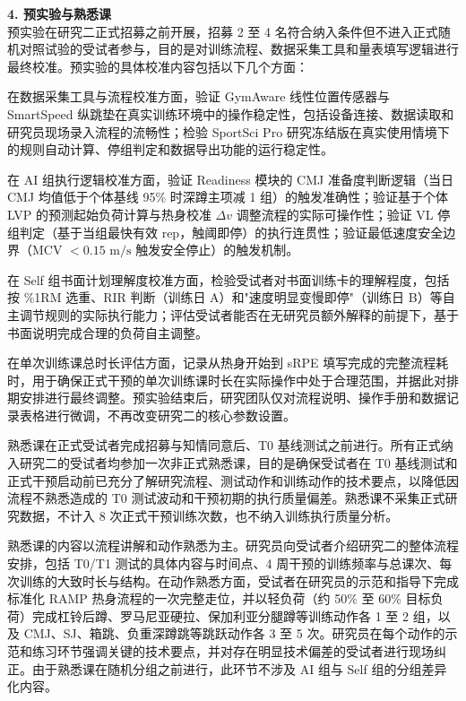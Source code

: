 \documentclass[UTF8,zihao=-4,twoside,openany]{ctexbook}
\begin{document}
\vspace{0.2cm}
\noindent \textbf{4. 预实验与熟悉课} \\
预实验在研究二正式招募之前开展，招募 2 至 4 名符合纳入条件但不进入正式随机对照试验的受试者参与，目的是对训练流程、数据采集工具和量表填写逻辑进行最终校准。预实验的具体校准内容包括以下几个方面：

在数据采集工具与流程校准方面，验证 GymAware 线性位置传感器与 SmartSpeed 纵跳垫在真实训练环境中的操作稳定性，包括设备连接、数据读取和研究员现场录入流程的流畅性；检验 SportSci Pro 研究冻结版在真实使用情境下的规则自动计算、停组判定和数据导出功能的运行稳定性。

在 AI 组执行逻辑校准方面，验证 Readiness 模块的 CMJ 准备度判断逻辑（当日 CMJ 均值低于个体基线 95\% 时深蹲主项减 1 组）的触发准确性；验证基于个体 LVP 的预测起始负荷计算与热身校准 $\Delta v$ 调整流程的实际可操作性；验证 VL 停组判定（基于当组最快有效 rep，触阈即停）的执行连贯性；验证最低速度安全边界（MCV $<0.15\text{ m/s}$ 触发安全停止）的触发机制。

在 Self 组书面计划理解度校准方面，检验受试者对书面训练卡的理解程度，包括按 \%1RM 选重、RIR 判断（训练日 A）和"速度明显变慢即停"（训练日 B）等自主调节规则的实际执行能力；评估受试者能否在无研究员额外解释的前提下，基于书面说明完成合理的负荷自主调整。

在单次训练课总时长评估方面，记录从热身开始到 sRPE 填写完成的完整流程耗时，用于确保正式干预的单次训练课时长在实际操作中处于合理范围，并据此对排期安排进行最终调整。预实验结束后，研究团队仅对流程说明、操作手册和数据记录表格进行微调，不再改变研究二的核心参数设置。

熟悉课在正式受试者完成招募与知情同意后、T0 基线测试之前进行。所有正式纳入研究二的受试者均参加一次非正式熟悉课，目的是确保受试者在 T0 基线测试和正式干预启动前已充分了解研究流程、测试动作和训练动作的技术要点，以降低因流程不熟悉造成的 T0 测试波动和干预初期的执行质量偏差。熟悉课不采集正式研究数据，不计入 8 次正式干预训练次数，也不纳入训练执行质量分析。

熟悉课的内容以流程讲解和动作熟悉为主。研究员向受试者介绍研究二的整体流程安排，包括 T0/T1 测试的具体内容与时间点、4 周干预的训练频率与总课次、每次训练的大致时长与结构。在动作熟悉方面，受试者在研究员的示范和指导下完成标准化 RAMP 热身流程的一次完整走位，并以轻负荷（约 50\% 至 60\% 目标负荷）完成杠铃后蹲、罗马尼亚硬拉、保加利亚分腿蹲等训练动作各 1 至 2 组，以及 CMJ、SJ、箱跳、负重深蹲跳等跳跃动作各 3 至 5 次。研究员在每个动作的示范和练习环节强调关键的技术要点，并对存在明显技术偏差的受试者进行现场纠正。由于熟悉课在随机分组之前进行，此环节不涉及 AI 组与 Self 组的分组差异化内容。
\end{document}
